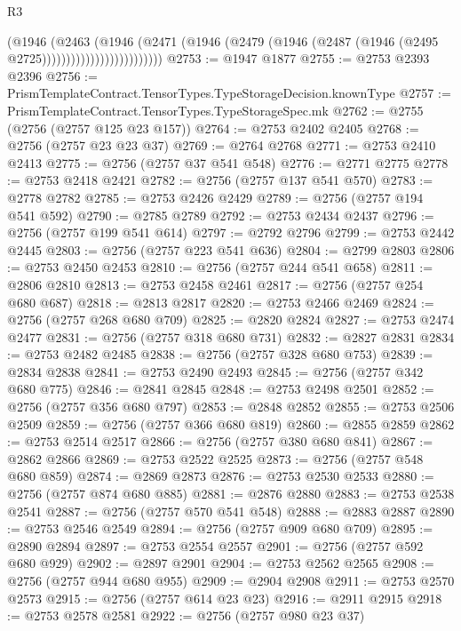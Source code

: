 \begin{lexlean}{R3}
\begin{coremodule}
                                  (@1946
                                    (@2463
                                      (@1946
                                        (@2471
                                          (@1946
                                            (@2479
                                              (@1946
                                                (@2487 (@1946 (@2495 @2725)))))))))))))))))))))))))
@2753 := @1947 @1877
@2755 := @2753 @2393 @2396
@2756 := PrismTemplateContract.TensorTypes.TypeStorageDecision.knownType
@2757 := PrismTemplateContract.TensorTypes.TypeStorageSpec.mk
@2762 := @2755 (@2756 (@2757 @125 @23 @157))
@2764 := @2753 @2402 @2405
@2768 := @2756 (@2757 @23 @23 @37)
@2769 := @2764 @2768
@2771 := @2753 @2410 @2413
@2775 := @2756 (@2757 @37 @541 @548)
@2776 := @2771 @2775
@2778 := @2753 @2418 @2421
@2782 := @2756 (@2757 @137 @541 @570)
@2783 := @2778 @2782
@2785 := @2753 @2426 @2429
@2789 := @2756 (@2757 @194 @541 @592)
@2790 := @2785 @2789
@2792 := @2753 @2434 @2437
@2796 := @2756 (@2757 @199 @541 @614)
@2797 := @2792 @2796
@2799 := @2753 @2442 @2445
@2803 := @2756 (@2757 @223 @541 @636)
@2804 := @2799 @2803
@2806 := @2753 @2450 @2453
@2810 := @2756 (@2757 @244 @541 @658)
@2811 := @2806 @2810
@2813 := @2753 @2458 @2461
@2817 := @2756 (@2757 @254 @680 @687)
@2818 := @2813 @2817
@2820 := @2753 @2466 @2469
@2824 := @2756 (@2757 @268 @680 @709)
@2825 := @2820 @2824
@2827 := @2753 @2474 @2477
@2831 := @2756 (@2757 @318 @680 @731)
@2832 := @2827 @2831
@2834 := @2753 @2482 @2485
@2838 := @2756 (@2757 @328 @680 @753)
@2839 := @2834 @2838
@2841 := @2753 @2490 @2493
@2845 := @2756 (@2757 @342 @680 @775)
@2846 := @2841 @2845
@2848 := @2753 @2498 @2501
@2852 := @2756 (@2757 @356 @680 @797)
@2853 := @2848 @2852
@2855 := @2753 @2506 @2509
@2859 := @2756 (@2757 @366 @680 @819)
@2860 := @2855 @2859
@2862 := @2753 @2514 @2517
@2866 := @2756 (@2757 @380 @680 @841)
@2867 := @2862 @2866
@2869 := @2753 @2522 @2525
@2873 := @2756 (@2757 @548 @680 @859)
@2874 := @2869 @2873
@2876 := @2753 @2530 @2533
@2880 := @2756 (@2757 @874 @680 @885)
@2881 := @2876 @2880
@2883 := @2753 @2538 @2541
@2887 := @2756 (@2757 @570 @541 @548)
@2888 := @2883 @2887
@2890 := @2753 @2546 @2549
@2894 := @2756 (@2757 @909 @680 @709)
@2895 := @2890 @2894
@2897 := @2753 @2554 @2557
@2901 := @2756 (@2757 @592 @680 @929)
@2902 := @2897 @2901
@2904 := @2753 @2562 @2565
@2908 := @2756 (@2757 @944 @680 @955)
@2909 := @2904 @2908
@2911 := @2753 @2570 @2573
@2915 := @2756 (@2757 @614 @23 @23)
@2916 := @2911 @2915
@2918 := @2753 @2578 @2581
@2922 := @2756 (@2757 @980 @23 @37)

\end{coremodule}
\end{lexlean}
